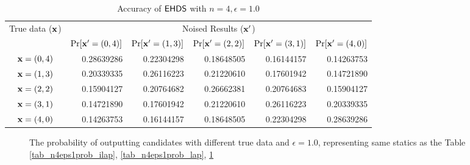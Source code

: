 \documentclass{article}
\begin{document}
\begin{table}[htbp]
	\scriptsize
	\centering
	\caption{Accuracy of $\mathsf{EHDS}$ with $n = 4, \epsilon = 1.0$}
	\label{tab_n4eps1prob_exp}
\begin{tabular}{|c||r|r|r|r|r|}
	\hline

	\multirow{2}{*}{True data ($\textbf{x}$)}
								& \multicolumn{5}{c|}{Noised Results ($\textbf{x}'$)}  
								\\ \cline{2-6}
	                      		&  $\Pr[\textbf{x}' = (0, 4)]$  	
	                      		&  $\Pr[\textbf{x}' = (1, 3)]$ 	
	                      		&  $\Pr[\textbf{x}' = (2, 2)]$ 	
	                      		&  $\Pr[\textbf{x}' = (3, 1)]$ 	
	                      		&  $\Pr[\textbf{x}' = (4, 0)]$ 	
	                      		\\  \hline
	                      		\hline
	$\textbf{x} = (0,4)$          & 0.28639286
								& 0.22304298
								& 0.18648505
								& 0.16144157
								& 0.14263753
								\\  \hline
	$\textbf{x} = (1,3)$          & 0.20339335
								& 0.26116223
								& 0.21220610
								& 0.17601942
								& 0.14721890
								\\  \hline
	$\textbf{x} = (2,2)$          & 0.15904127
								& 0.20764682
								& 0.26662381
								& 0.20764683
								& 0.15904127
								\\  \hline
	$\textbf{x} = (3,1)$          & 0.14721890
								& 0.17601942
								& 0.21220610
								& 0.26116223
								& 0.20339335
								\\  \hline
	$\textbf{x} = (4,0)$          & 0.14263753
								& 0.16144157
								& 0.18648505
								& 0.22304298
								& 0.28639286
								\\  \hline
\end{tabular}
\vspace{-0.5cm}
\end{table}

\begin{figure*}[ht]
\begin{center}
\vspace{-0.5cm}
     \centering
      \caption{\footnotesize The probability of outputting candidates with different true data and $\epsilon = 1.0$, representing same statics as the Table \ref{tab_n4eps1prob_ilap}, \ref{tab_n4eps1prob_lap}, \ref{tab_n4eps1prob_exp}}
\vspace{-0.5cm}
\end{center}
\end{figure*}
\end{document}
